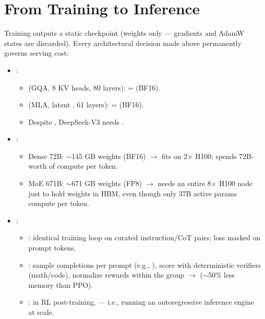 \section{From Training to Inference}

Training outputs a static checkpoint (weights only --- gradients and AdamW states are discarded). Every architectural decision made above permanently governs serving cost:

\begin{itemize}
    \item {}:
    \begin{itemize}
        \item {} (GQA, 8 KV heads, 80 layers):  =  (BF16).
        \item {} (MLA, latent , 61 layers):  =  (BF16).
        \item Despite , DeepSeek-V3 needs .
    \end{itemize}
    \item {}:
    \begin{itemize}
        \item Dense 72B: $\sim$145 GB weights (BF16) $\rightarrow$ fits on 2$\times$ H100; spends 72B-worth of compute per token.
        \item MoE 671B: $\sim$671 GB weights (FP8) $\rightarrow$ needs an entire 8$\times$ H100 node just to hold weights in HBM, even though only 37B active params compute per token.
    \end{itemize}
    \item {}:
    \begin{itemize}
        \item {}: identical training loop on curated instruction/CoT pairs; loss masked on prompt tokens.
        \item {}: sample  completions per prompt (e.g., ), score with deterministic verifiers (math/code), normalize rewards within the group $\rightarrow$  ($\sim$50\% less memory than PPO).
        \item {}: in RL post-training,  --- i.e., running an autoregressive inference engine at scale.
    \end{itemize}
\end{itemize}
